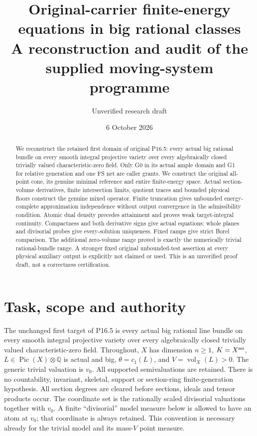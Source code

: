 \documentclass[10pt]{article}
\title{Original-carrier finite-energy equations in big rational classes\\
\large A reconstruction and audit of the supplied moving-system programme}
\author{Unverified research draft}
\date{6 October 2026}
\newcommand{\vol}{\operatorname{vol}}
\begin{document}
\maketitle
\begin{abstract}
We reconstruct the retained first domain of original P16.5: every actual
big rational bundle on every smooth integral projective variety over every
algebraically closed trivially valued characteristic-zero field. Only G0 in
its actual ample domain and G1 for relative generation and one FS net are
caller grants. We construct the original all-point cone, its genuine minimal
reference and entire finite-energy space. Actual section-volume derivatives,
finite intersection limits, quotient traces and bounded physical floors
construct the genuine mixed operator. Finite truncation gives unbounded
energy-complete approximation independence without output convergence in
the admissibility condition. Atomic dual density precedes attainment and
proves weak target-integral continuity. Compactness and both derivative
signs give actual equations; whole planes and divisorial probes give
every-solution uniqueness. Fixed ramps give strict Borel comparison.
The additional zero-volume range proved is exactly the numerically trivial
rational-bundle range. A stronger fixed original unbounded-test assertion
at every physical auxiliary output is explicitly not claimed or used.
This is an unverified proof draft, not a correctness certification.
\end{abstract}

\section{Task, scope and authority}
The unchanged first target of P16.5 is every actual big rational line bundle
on every smooth integral projective variety over every algebraically closed
trivially valued characteristic-zero field. Throughout, $X$ has dimension
$n\geq1$, $K=X^{\rm an}$, $L\in\operatorname{Pic}(X)\otimes\mathbb Q$
is actual and big, $\theta=c_1(L)$, and $V=\vol_X(L)>0$.
The generic trivial valuation is $v_0$. All supported semivaluations are
retained. There is no countability, invariant, skeletal, support or
section-ring finite-generation hypothesis. All section degrees are cleared
before sections, ideals and tensor products occur.
The coordinate set is the rationally scaled divisorial valuations together
with $v_0$. A finite ``divisorial'' model measure below is allowed to have
an atom at $v_0$; that coordinate is always retained. This convention is
necessary already for the trivial model and its mass-$V$ point measure.
\end{document}
